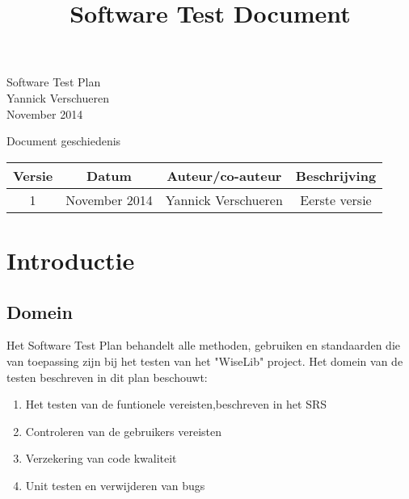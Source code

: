\documentclass[a4paper]{article}
\title{Software Test Document}
\begin{document}
\begin{titlepage}
    \vspace*{\fill}
    \begin{center}
      {\Huge Software Test Plan}\\[0.5cm]
      {\Large Yannick Verschueren}\\[0.4cm]
      November 2014
    \end{center}
    \vspace*{\fill}
  \end{titlepage}

\newpage

Document geschiedenis

\begin{center}
  \begin{tabular}{ c | c | c | c}
  
    
   Versie & Datum & Auteur/co-auteur & Beschrijving \\ \hline
   
   \hline

	1 & November 2014 & Yannick Verschueren & Eerste versie \\ 

    \hline
    
  \end{tabular}
\end{center}
	

\newpage

\renewcommand\contentsname{Inhoudstafel}
\tableofcontents


\newpage

\section{Introductie}
\subsection{Domein}

Het Software Test Plan behandelt alle methoden, gebruiken en standaarden die van toepassing zijn bij het testen van het "WiseLib" project. Het domein van de testen beschreven in dit plan beschouwt:

\begin{enumerate}
\item Het testen van de funtionele vereisten,beschreven in het SRS %
\item Controleren van de gebruikers vereisten %
\item Verzekering van code kwaliteit
\item Unit testen en verwijderen van bugs 

\end{enumerate}
\end{document}
